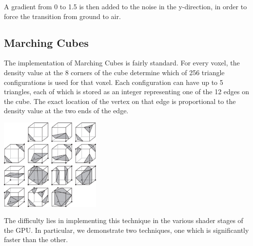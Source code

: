\documentclass {article}
\begin{document}
A gradient from 0 to 1.5 is then added to the noise in the y-direction, in order to force the transition from ground to air.

\subsection{Marching Cubes}

The implementation of Marching Cubes is fairly standard\cite{Lorensen:1987:MCH:37401.37422}. For every voxel, the density value at the 8 corners of the cube determine which of 256 triangle configurations is used for that voxel. Each configuration can have up to 5 triangles, each of which is stored as an integer representing one of the 12 edges on the cube. The exact location of the vertex on that edge is proportional to the density value at the two ends of the edge.

\begin{center}
    \includegraphics[width=5cm]{marchingcubes.jpg}
\end{center}

The difficulty lies in implementing this technique in the various shader stages of the GPU. In particular, we demonstrate two techniques, one which is significantly faster than the other.
\end{document}
